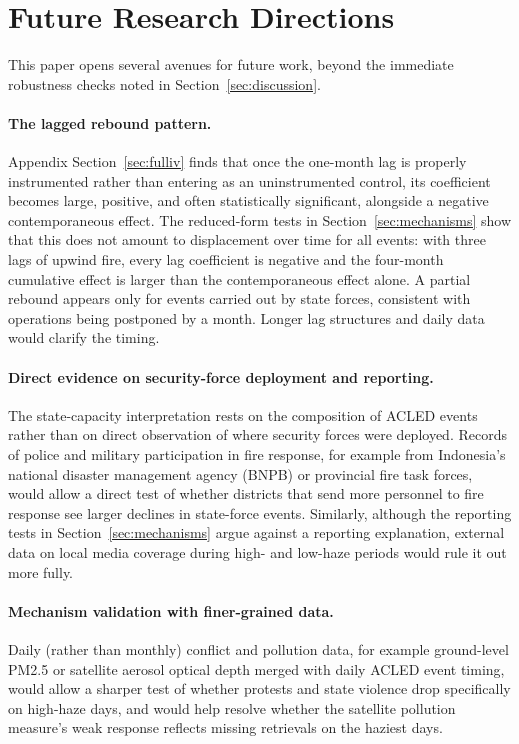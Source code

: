 \documentclass[12pt]{article}
\begin{document}
\section{Future Research Directions}
\label{sec:future}

This paper opens several avenues for future work, beyond the immediate robustness checks noted in Section~\ref{sec:discussion}.

\paragraph{The lagged rebound pattern.} Appendix Section~\ref{sec:fulliv} finds that once the one-month lag is properly instrumented rather than entering as an uninstrumented control, its coefficient becomes large, positive, and often statistically significant, alongside a negative contemporaneous effect. The reduced-form tests in Section~\ref{sec:mechanisms} show that this does not amount to displacement over time for all events: with three lags of upwind fire, every lag coefficient is negative and the four-month cumulative effect is larger than the contemporaneous effect alone. A partial rebound appears only for events carried out by state forces, consistent with operations being postponed by a month. Longer lag structures and daily data would clarify the timing.

\paragraph{Direct evidence on security-force deployment and reporting.} The state-capacity interpretation rests on the composition of ACLED events rather than on direct observation of where security forces were deployed. Records of police and military participation in fire response, for example from Indonesia's national disaster management agency (BNPB) or provincial fire task forces, would allow a direct test of whether districts that send more personnel to fire response see larger declines in state-force events. Similarly, although the reporting tests in Section~\ref{sec:mechanisms} argue against a reporting explanation, external data on local media coverage during high- and low-haze periods would rule it out more fully.

\paragraph{Mechanism validation with finer-grained data.} Daily (rather than monthly) conflict and pollution data, for example ground-level PM2.5 or satellite aerosol optical depth merged with daily ACLED event timing, would allow a sharper test of whether protests and state violence drop specifically on high-haze days, and would help resolve whether the satellite pollution measure's weak response reflects missing retrievals on the haziest days.
\end{document}
